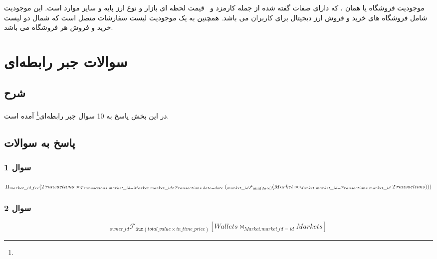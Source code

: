 \documentclass{book}
\begin{document}
        
        \subsection{}
        موجودیت فروشگاه یا همان ، که دارای صفات گفته شده از جمله کارمزد و  قیمت لحظه ای بازار و نوع ارز پایه و سایر موارد است. این موجودیت شامل فروشگاه های خرید و فروش ارز دیجیتال برای کاربران می باشد. همچنین به یک موجودیت لیست سفارشات متصل است که شمال دو لیست خرید و فروش هر فروشگاه می باشد.

        \subsection{}
        \subsection{}
        \subsection{}


        \chapter{سوالات جبر رابطه‌ای}
        \section{شرح}
        در این بخش پاسخ به 10 سوال جبر رابطه‌ای\footnote{} آمده است.
        \section{پاسخ به سوالات}
        \subsection{سوال 1}

        $\Pi_{market\_id, fee}(Transactions \\ \bowtie_{Transactions.market\_id = Market.market\_id \land Transactions.date = date}(\\
        _{market\_id}\mathcal{F}_{\min (date)} (\\
        Market \bowtie_{Market.market\_id = Transactions.market\_id} Transactions)))$

        \subsection{سوال 2}
        $$_{owner\_id}\mathcal{F}_{\mathtt{Sum}(total\_value \times in\_time\_price)} [ Wallets \bowtie_{Market.market\_id = id} Markets]$$
\end{document}
